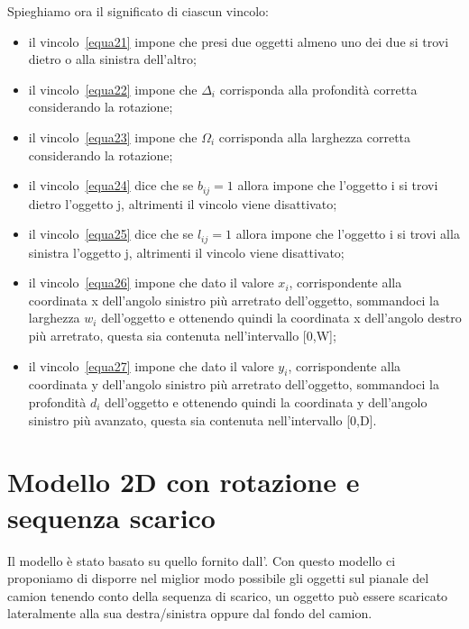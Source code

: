 Spieghiamo ora il significato di ciascun vincolo:
\begin{itemize}
	\item il vincolo~\eqref{equa21} impone che presi due oggetti almeno uno dei due si trovi dietro o alla sinistra dell'altro;
	\item il vincolo~\eqref{equa22} impone che $\Delta_i$ corrisponda alla profondità corretta considerando la rotazione;
	\item il vincolo~\eqref{equa23} impone che $\Omega_i$ corrisponda alla larghezza corretta considerando la rotazione;
	\item il vincolo~\eqref{equa24} dice che se $b_{ij} = 1$ allora impone che l'oggetto i si trovi dietro l'oggetto j, altrimenti il vincolo viene disattivato;
	\item il vincolo~\eqref{equa25} dice che se $l_{ij} = 1$ allora impone che l'oggetto i si trovi alla sinistra l'oggetto j, altrimenti il vincolo viene disattivato;
	\item il vincolo~\eqref{equa26} impone che dato il valore $x_i$, corrispondente alla coordinata x dell'angolo sinistro più arretrato dell'oggetto, sommandoci la larghezza $w_i$ dell'oggetto e ottenendo quindi la coordinata x dell'angolo destro più arretrato, questa sia contenuta nell'intervallo [0,W];
	\item il vincolo~\eqref{equa27} impone che dato il valore $y_i$, corrispondente alla coordinata y dell'angolo sinistro più arretrato dell'oggetto, sommandoci la profondità $d_i$ dell'oggetto e ottenendo quindi la coordinata y dell'angolo sinistro più avanzato, questa sia contenuta nell'intervallo [0,D].
\end{itemize}

\newpage
\section{Modello 2D con rotazione e sequenza scarico}
Il modello è stato basato su quello fornito dall'.
Con questo modello ci proponiamo di disporre nel miglior modo possibile gli oggetti sul pianale del camion tenendo conto della sequenza di scarico, un oggetto può essere scaricato lateralmente alla sua destra/sinistra oppure dal fondo del camion.

